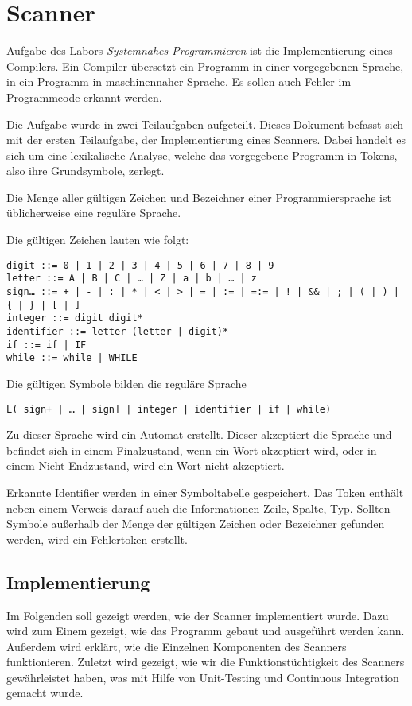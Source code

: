 \chapter{Scanner}\label{chap:intro}

Aufgabe des Labors \textit{Systemnahes Programmieren} ist die Implementierung eines Compilers. Ein Compiler übersetzt ein Programm in einer vorgegebenen Sprache, in ein Programm in maschinennaher Sprache. Es sollen auch Fehler im Programmcode erkannt werden.

Die Aufgabe wurde in zwei Teilaufgaben aufgeteilt. Dieses Dokument befasst sich mit der ersten Teilaufgabe, der Implementierung eines Scanners.
Dabei handelt es sich um eine lexikalische Analyse, welche das vorgegebene Programm in Tokens, also ihre Grundsymbole, zerlegt.

Die Menge aller gültigen Zeichen und Bezeichner einer Programmiersprache ist üblicherweise eine reguläre Sprache.

Die gültigen Zeichen lauten wie folgt:
\begin{verbatim}
digit ::= 0 | 1 | 2 | 3 | 4 | 5 | 6 | 7 | 8 | 9
letter ::= A | B | C | … | Z | a | b | … | z
sign… ::= + | - | : | * | < | > | = | := | =:= | ! | && | ; | ( | ) | { | } | [ | ]
integer ::= digit digit*
identifier ::= letter (letter | digit)*
if ::= if | IF
while ::= while | WHILE
\end{verbatim}

Die gültigen Symbole bilden die reguläre Sprache
\begin{verbatim}
L( sign+ | … | sign] | integer | identifier | if | while)
\end{verbatim}

Zu dieser Sprache wird ein Automat erstellt. Dieser akzeptiert die Sprache und befindet sich in einem Finalzustand, wenn ein Wort akzeptiert wird, oder in einem Nicht-Endzustand, wird ein Wort nicht akzeptiert.

Erkannte Identifier werden in einer Symboltabelle gespeichert. Das Token enthält neben einem Verweis darauf auch die Informationen Zeile, Spalte, Typ. Sollten Symbole außerhalb der Menge der gültigen Zeichen oder Bezeichner gefunden werden, wird ein Fehlertoken erstellt.

\section{Implementierung}
Im Folgenden soll gezeigt werden, wie der Scanner implementiert wurde. Dazu wird zum Einem gezeigt, wie das Programm gebaut und ausgeführt werden kann. Außerdem wird erklärt, wie die Einzelnen Komponenten des Scanners funktionieren. Zuletzt wird gezeigt, wie wir die Funktionstüchtigkeit des Scanners gewährleistet haben, was mit Hilfe von Unit-Testing und Continuous Integration gemacht wurde.

